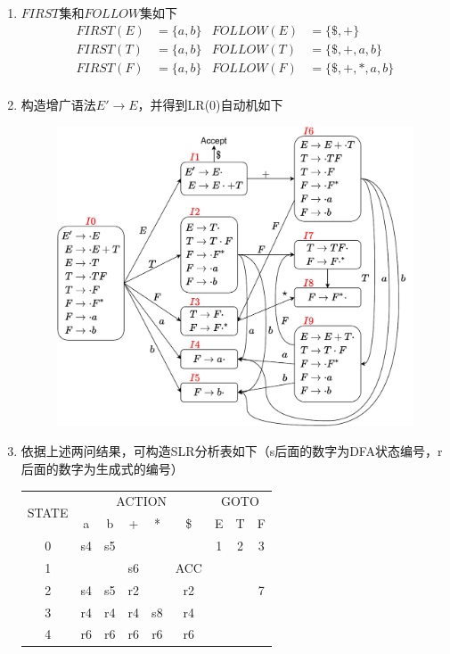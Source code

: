 \begin{analysis}
\begin{enumerate}
	\item $FIRST$集和$FOLLOW$集如下
	\[\begin{array}{rlrl}
	FIRST(E) &= \{a,b\} & FOLLOW(E) &=\{\$,+\}\\
	FIRST(T) &= \{a,b\} & FOLLOW(T) &=\{\$,+,a,b\}\\
	FIRST(F) &= \{a,b\} & FOLLOW(F) &=\{\$,+,*,a,b\}\\
	\end{array}\]
	\item 构造增广语法$E'\to E$，并得到LR(0)自动机如下
	\begin{figure}[H]
	\centering
	\includegraphics[width=0.8\linewidth]{fig/T06.pdf}
	\end{figure}
	\item 依据上述两问结果，可构造SLR分析表如下（s后面的数字为DFA状态编号，r后面的数字为生成式的编号）
	\begin{center}
	\begin{tabular}{|c|ccccc|ccc|}\hline
	\multirow{2}{*}{STATE} & \multicolumn{5}{c|}{ACTION} & \multicolumn{3}{c|}{GOTO}\\\cline{2-9}
	  & a  & b  & +  & *  & \$  & E & T & F \\\hline
	0 & s4 & s5 &    &    &     & 1 & 2 & 3 \\\hline
	1 &    &    & s6 &    & ACC &   &   &   \\\hline
	2 & s4 & s5 & r2 &    & r2  &   &   & 7 \\\hline
	3 & r4 & r4 & r4 & s8 & r4  &   &   &   \\\hline
	4 & r6 & r6 & r6 & r6 & r6  &   &   &   \\\hline

\end{tabular}
\end{center}
\end{enumerate}
\end{analysis}

